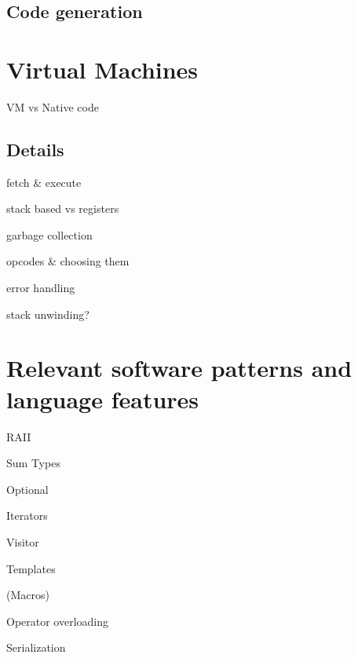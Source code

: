 		\subsection{Code generation}

	\section{Virtual Machines}
	
		VM vs Native code
		
		\subsection{Details} %
			fetch \& execute
			
			stack based vs registers
			
			garbage collection
			
			opcodes \& choosing them
			
			error handling
			
			stack unwinding?
	
	\section{Relevant software patterns and language features}
	
		RAII
		
		Sum Types
		
		Optional
		
		Iterators
		
		Visitor
		
		Templates
		
		(Macros)
		
		Operator overloading
		
		Serialization
